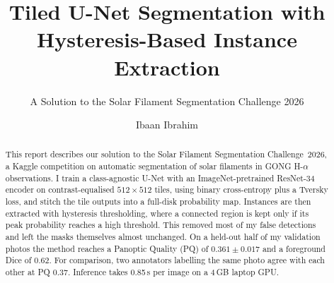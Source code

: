 \documentclass[sigconf]{acmart}
\begin{document}
\title{Tiled U-Net Segmentation with Hysteresis-Based Instance Extraction}  %
\subtitle{A Solution to the Solar Filament Segmentation Challenge 2026} %


\author{Ibaan Ibrahim}

\begin{abstract}
    This report describes our solution to the Solar Filament Segmentation Challenge~2026, a Kaggle competition on automatic segmentation of solar filaments in GONG H-$\alpha$ observations. I train a class-agnostic U-Net with an ImageNet-pretrained ResNet-34 encoder on contrast-equalised $512\times512$ tiles, using binary cross-entropy plus a Tversky loss, and stitch the tile outputs into a full-disk probability map. Instances are then extracted with hysteresis thresholding, where a connected region is kept only if its peak probability reaches a high threshold. This removed most of my false detections and left the masks themselves almost unchanged. On a held-out half of my validation photos the method reaches a Panoptic Quality (PQ) of $0.361\pm0.017$ and a foreground Dice of $0.62$. For comparison, two annotators labelling the same photo agree with each other at PQ $0.37$. Inference takes 0.85\,s per image on a 4\,GB laptop GPU.
\end{abstract}

\maketitle

\ifguideStyle
{}
\par\medskip
\fi

\end{document}
